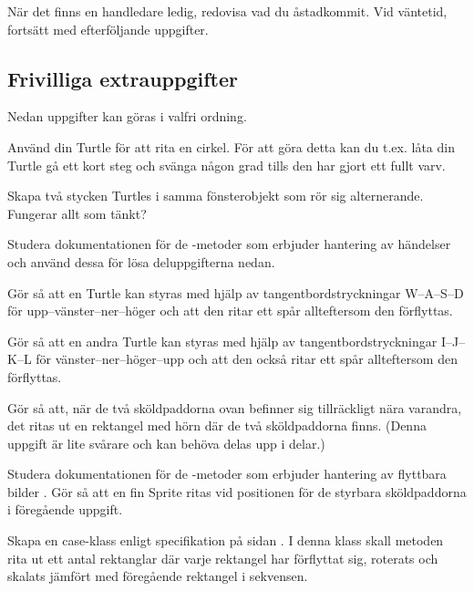\noindent När det finns en handledare ledig, redovisa vad du åstadkommit. Vid väntetid, fortsätt med efterföljande uppgifter.


\begin{figure}[H]
\end{figure}





\clearpage

\subsection{Frivilliga extrauppgifter}

Nedan uppgifter kan göras i valfri ordning.

\Task Använd din Turtle för att rita en cirkel. För att göra detta kan du t.ex. låta din Turtle gå ett kort steg och svänga någon grad tills den har gjort ett fullt varv.

\Task Skapa två stycken Turtles i samma fönsterobjekt som rör sig alternerande. Fungerar allt som tänkt?


\Task Studera dokumentationen för de -metoder som erbjuder hantering av händelser  och använd dessa för lösa deluppgifterna nedan.

\Subtask Gör så att en Turtle kan styras med hjälp av tangentbordstryckningar W--A--S--D för upp--vänster--ner--höger och att den ritar ett spår allteftersom den förflyttas.

\Subtask Gör så att en andra Turtle kan styras med hjälp av tangentbordstryckningar I--J--K--L för vänster--ner--höger--upp och att den också ritar ett spår allteftersom den förflyttas.

\Subtask Gör så att, när de två sköldpaddorna ovan befinner sig tillräckligt nära varandra, det ritas ut en rektangel med hörn där de två sköldpaddorna finns. (Denna uppgift är lite svårare och kan behöva delas upp i delar.)


\Task Studera dokumentationen för de -metoder som erbjuder hantering av flyttbara bilder . Gör så att en fin Sprite ritas vid positionen för de styrbara sköldpaddorna i föregående uppgift.


\Task Skapa en case-klass  enligt specifikation på sidan \pageref{code:classes:graphics:rectanglesequence}. I denna klass skall metoden  rita ut ett antal rektanglar där varje rektangel har förflyttat sig, roterats och skalats jämfört med föregående rektangel i sekvensen.

